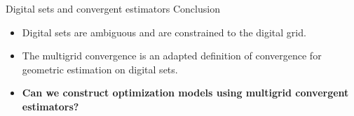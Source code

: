 \begin{frame}
	{Digital sets and convergent estimators}	
	{Conclusion}	

	\begin{itemize}
		\item{Digital sets are ambiguous and are constrained to the digital grid.}\\[1em]
		\item{The multigrid convergence is an adapted definition of convergence for geometric estimation on digital sets.}\\[2em]\pause
		\item[]{\textbf{Can we construct optimization models using multigrid convergent estimators?}}
	\end{itemize}

\end{frame}